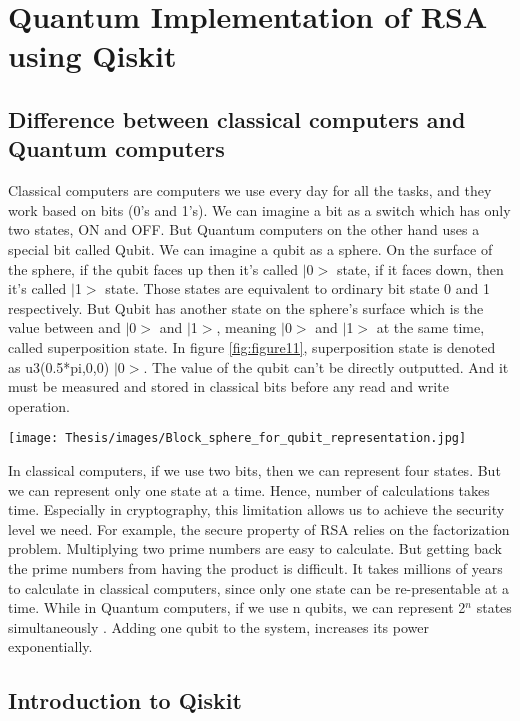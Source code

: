 \documentclass{cpp}
\begin{document}
\chapter{Quantum Implementation of RSA using Qiskit}
\section{Difference between classical computers and Quantum computers}
Classical computers are computers we use every day for all the tasks, and they work based on bits (0’s and 1’s). We can imagine a bit as a switch which has only two states, ON and OFF. But Quantum computers on the other hand uses a special bit called Qubit. We can imagine a qubit as a sphere. On the surface of the sphere, if the qubit faces up then it’s called $|$0$>$ state, if it faces down, then it’s called $|$1$>$ state. Those states are equivalent to ordinary bit state 0 and 1 respectively. But Qubit has another state on the sphere’s surface which is the value between and $|$0$>$ and $|$1$>$, meaning $|$0$>$ and $|$1$>$ at the same time, called superposition state. In figure \ref{fig:figure11}, superposition state is denoted as u3(0.5*pi,0,0) $|$0$>$. The value of the qubit can’t be directly outputted. And it must be measured and stored in classical bits before any read and write operation.

\begin{figure*}[htp]
    \centering
    \texttt{[image: Thesis/images/Block\_sphere\_for\_qubit\_representation.jpg]}
    \caption{Block sphere for qubit representation}
    \label{fig:figure11}
\end{figure*}

In classical computers, if we use two bits, then we can represent four states. But we can represent only one state at a time. Hence, number of calculations takes time. Especially in cryptography, this limitation allows us to achieve the security level we need. For example, the secure property of RSA relies on the factorization problem. Multiplying two prime numbers are easy to calculate. But getting back the prime numbers from having the product is difficult. It takes millions of years to calculate in classical computers, since only one state can be re-presentable at a time.  While in Quantum computers, if we use n qubits, we can represent 2$^n$ states simultaneously \cite{quantum_computing_medium}. Adding one qubit to the system, increases its power exponentially. 
\section{Introduction to Qiskit}
\end{document}
